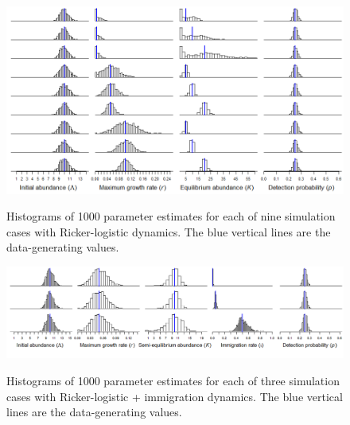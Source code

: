 \documentclass{article}
\begin{document}
\begin{landscape}
\clearpage


\begin{figure}
\caption{Histograms of 1000 parameter estimates for each of nine
simulation cases with Ricker-logistic dynamics. The blue vertical lines are the 
data-generating values.}
  \centering
  \includegraphics{../figs/rick_hists}
\label{fig:rick_hists}
\end{figure}

\begin{figure}
\caption{Histograms of 1000 parameter estimates for each of three
simulation cases with Ricker-logistic + immigration dynamics. The blue vertical lines are the 
data-generating values.}
  \centering
  \includegraphics[width=8.5in]{../figs/ricki_hists}
\label{fig:ricki_hists}
\end{figure}


\end{landscape}
\end{document}
